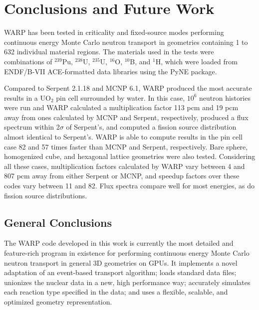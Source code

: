 \chapter{Conclusions and Future Work}
\label{chap:conclusions}

WARP has been tested in criticality and fixed-source modes performing continuous energy Monte Carlo neutron transport in geometries containing 1 to 632 individual material regions.  The materials used in the tests were combinations of  $^{239}$Pu, $^{238}$U, $^{235}$U, $^{16}$O, $^{10}$B, and $^{1}$H, which were loaded from ENDF/B-VII ACE-formatted data libraries using the PyNE package.  

Compared to Serpent 2.1.18 and MCNP 6.1, WARP produced the most accurate results in a UO$_2$ pin cell surrounded by water.   In this case, $10^6$ neutron histories were run and WARP calculated a multiplication factor 113 pcm and 19 pcm away from ones calculated by MCNP and Serpent, respectively, produced a flux spectrum within 2$\sigma$ of Serpent's, and computed a fission source distribution almost identical to Serpent's.  WARP is able to compute results in the pin cell case 82 and 57 times faster than MCNP and Serpent, respectively.  Bare sphere, homogenized cube, and hexagonal lattice geometries were also tested.  Considering all these cases, multiplication factors calculated by WARP vary between 4 and 807 pcm away from either Serpent or MCNP, and speedup factors over these codes vary between 11 and 82.  Flux spectra compare well for most energies, as do fission source distributions.

\section{General Conclusions}

The WARP code developed in this work is currently the most detailed and feature-rich program in existence for performing continuous energy Monte Carlo neutron transport in general 3D geometries on GPUs.  It implements a novel adaptation of an event-based transport algorithm; loads standard data files; unionizes the nuclear data in a new, high performance way; accurately simulates each reaction type specified in the data; and uses a flexible, scalable, and optimized geometry representation.

